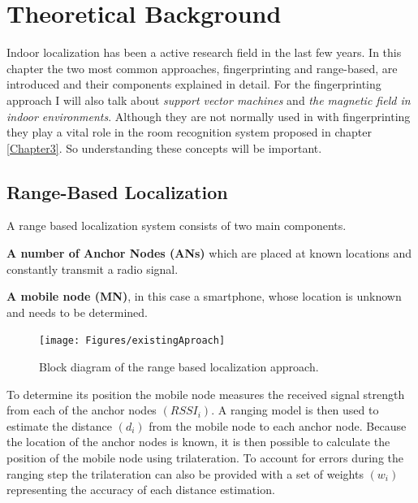 
\chapter{Theoretical Background} %

\label{Chapter2} %

Indoor localization has been a active research field in the last few years. In this chapter the two most common approaches, fingerprinting and range-based, are introduced and their components explained in detail. For the fingerprinting approach I will also talk about \emph{support vector machines} and \emph{the magnetic field in indoor environments}. Although they are not normally used in with fingerprinting they play a vital role in the room recognition system proposed in chapter \ref{Chapter3}. So understanding these concepts will be important.

\section{Range-Based Localization}
\label{therory:range-based}

A range based localization system consists of two main components.

\textbf{A number of Anchor Nodes (ANs)} which are placed at known locations and constantly transmit a radio signal.

\textbf{A mobile node (MN)}, in this case a smartphone, whose location is unknown and needs to be determined.

\begin{figure}[ht]
\centering
\texttt{[image: Figures/existingAproach]}
\decoRule
\caption[Range-based localization approach]{Block diagram of the range based localization approach.}
\label{fig:existingApproach}
\end{figure}

To determine its position the mobile node measures the received signal strength from each of the anchor nodes $(RSSI_i)$. A ranging model is then used to estimate the distance $(d_i)$ from the mobile node to each anchor node. Because the location of the anchor nodes is known, it is then possible to calculate the position of the mobile node using trilateration. To account for errors during the ranging step the trilateration can also be provided with a set of weights $(w_i)$ representing the accuracy of each distance estimation.


